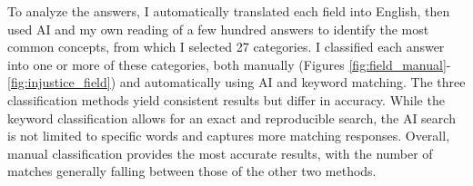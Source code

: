 \documentclass[12pt,english]{article}
\begin{document}
\begin{bibunit}
To analyze the answers, I automatically translated each field into English, then used AI and my own reading of a few hundred answers to identify the most common concepts, from which I selected 27 categories. I classified each answer into one or more of these categories, both manually (Figures \ref{fig:field_manual}-\ref{fig:injustice_field}) and automatically using AI %
and keyword matching. %
The three classification methods yield consistent results but differ in accuracy. While the keyword classification allows for an exact and reproducible search, the AI search is not limited to specific words and captures more matching responses. Overall, manual classification provides the most accurate results, with the number of matches generally falling between those of the other two methods.


\end{bibunit}
\end{document}
